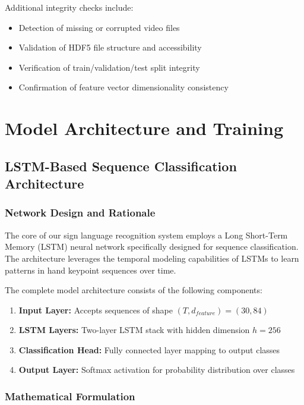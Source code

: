 \documentclass[11pt, a4paper]{article}
\begin{document}
Additional integrity checks include:
\begin{itemize}
    \item Detection of missing or corrupted video files
    \item Validation of HDF5 file structure and accessibility
    \item Verification of train/validation/test split integrity
    \item Confirmation of feature vector dimensionality consistency
\end{itemize}

\section{Model Architecture and Training}

\subsection{LSTM-Based Sequence Classification Architecture}

\subsubsection{Network Design and Rationale}

The core of our sign language recognition system employs a Long Short-Term Memory (LSTM) neural network specifically designed for sequence classification. The architecture leverages the temporal modeling capabilities of LSTMs to learn patterns in hand keypoint sequences over time.

The complete model architecture consists of the following components:

\begin{enumerate}
    \item \textbf{Input Layer:} Accepts sequences of shape $(T, d_{feature}) = (30, 84)$
    \item \textbf{LSTM Layers:} Two-layer LSTM stack with hidden dimension $h = 256$
    \item \textbf{Classification Head:} Fully connected layer mapping to output classes
    \item \textbf{Output Layer:} Softmax activation for probability distribution over classes
\end{enumerate}

\subsubsection{Mathematical Formulation}
\end{document}
